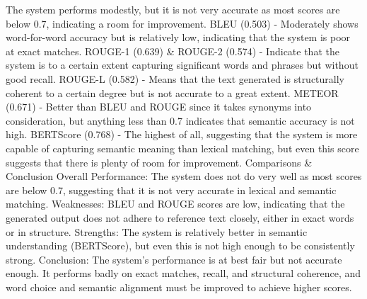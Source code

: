 The system performs modestly, but it is not very accurate as most scores are below 0.7, indicating a room for improvement.
 BLEU (0.503) - Moderately shows word-for-word accuracy but is relatively low, indicating that the system is poor at exact matches.
ROUGE-1 (0.639) \& ROUGE-2 (0.574) - Indicate that the system is to a certain extent capturing significant words and phrases but without good recall.
ROUGE-L (0.582) - Means that the text generated is structurally coherent to a certain degree but is not accurate to a great extent.
METEOR (0.671) - Better than BLEU and ROUGE since it takes synonyms into consideration, but anything less than 0.7 indicates that semantic accuracy is not high.
BERTScore (0.768) - The highest of all, suggesting that the system is more capable of capturing semantic meaning than lexical matching, but even this score suggests that there is plenty of room for improvement.
Comparisons \& Conclusion
Overall Performance: The system does not do very well as most scores are below 0.7, suggesting that it is not very accurate in lexical and semantic matching.
Weaknesses: BLEU and ROUGE scores are low, indicating that the generated output does not adhere to reference text closely, either in exact words or in structure.
Strengths: The system is relatively better in semantic understanding (BERTScore), but even this is not high enough to be consistently strong.
Conclusion: The system's performance is at best fair but not accurate enough. It performs badly on exact matches, recall, and structural coherence, and word choice and semantic alignment must be improved to achieve higher scores.

